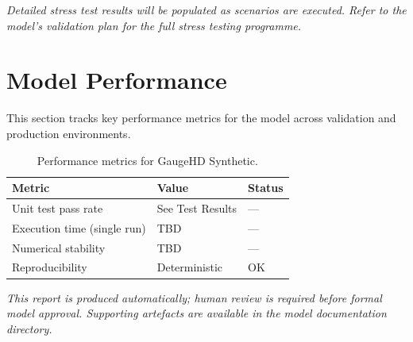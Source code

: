 \documentclass[11pt,a4paper]{article}
\begin{document}
\textit{Detailed stress test results will be populated as scenarios are executed.
Refer to the model's validation plan for the full stress testing programme.}

\section{Model Performance}

This section tracks key performance metrics for the model across
validation and production environments.

\begin{table}[H]
    \centering
    \caption{Performance metrics for GaugeHD Synthetic.}
    \begin{tabular}{lll}
        \toprule
        \textbf{Metric} & \textbf{Value} & \textbf{Status} \\
        \midrule
        Unit test pass rate & See Test Results & --- \\
        Execution time (single run) & TBD & --- \\
        Numerical stability & TBD & --- \\
        Reproducibility & Deterministic & OK \\
        \bottomrule
    \end{tabular}
\end{table}

\vspace{12pt}

\noindent\textit{\small This report is produced automatically; human review
is required before formal model approval. Supporting artefacts are available
in the model documentation directory.}
\end{document}
